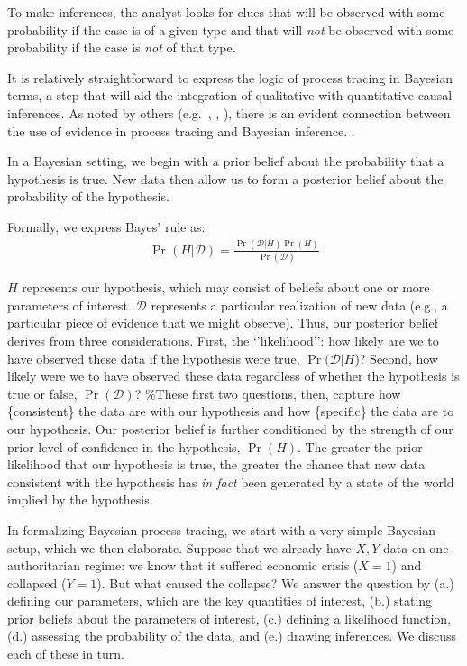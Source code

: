 \documentclass[12pt,]{book}
\begin{document}
To make inferences, the analyst looks for clues that will be observed with some probability if the case is of a given type and that will \emph{not} be observed with some probability if the case is \emph{not} of that type.

It is relatively straightforward to express the logic of process tracing in Bayesian terms, a step that will aid the integration of qualitative with quantitative causal inferences. As noted by others (e.g.~\citet{BennettBayes}, \citet{beachpedersen2013process}, \citet{rohlfing2012case}), there is an evident connection between the use of evidence in process tracing and Bayesian inference. .

In a Bayesian setting, we begin with a prior belief about the probability that a hypothesis is true. New data then allow us to form a posterior belief about the probability of the hypothesis.

Formally, we express Bayes' rule as:
\begin{eqnarray}
\Pr(H|\mathcal{D})=\frac{\Pr(\mathcal{D}|H)\Pr(H)}{\Pr(\mathcal{D})}
\end{eqnarray}

\(H\) represents our hypothesis, which may consist of beliefs about one or more parameters of interest. \(\mathcal{D}\) represents a particular realization of new data (e.g., a particular piece of evidence that we might observe). Thus, our posterior belief derives from three considerations. First, the `'likelihood'': how likely are we to have observed these data if the hypothesis were true, \(\Pr(\mathcal{D}|H\))? Second, how likely were we to have observed these data regardless of whether the hypothesis is true or false, \(\Pr(\mathcal{D})\)? \%These first two questions, then, capture how \{consistent\} the data are with our hypothesis and how \{specific\} the data are to our hypothesis.
Our posterior belief is further conditioned by the strength of our prior level of confidence in the hypothesis, \(\Pr(H)\). The greater the prior likelihood that our hypothesis is true, the greater the chance that new data consistent with the hypothesis has \emph{in fact} been generated by a state of the world implied by the hypothesis.

In formalizing Bayesian process tracing, we start with a very simple Bayesian setup, which we then elaborate. Suppose that we already have \(X,Y\) data on one authoritarian regime: we know that it suffered economic crisis (\(X=1\)) and collapsed (\(Y=1\)). But what caused the collapse? We answer the question by (a.) defining our parameters, which are the key quantities of interest, (b.) stating prior beliefs about the parameters of interest, (c.) defining a likelihood function, (d.) assessing the probability of the data, and (e.) drawing inferences. We discuss each of these in turn.
\end{document}
